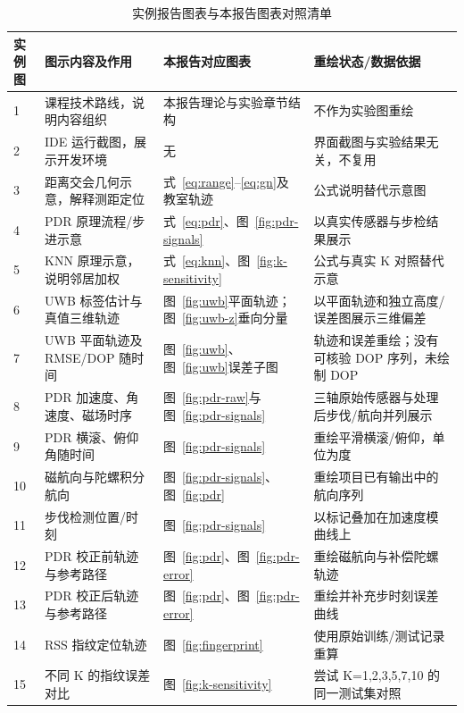 \begin{table}[htbp]
\centering\small
\caption{实例报告图表与本报告图表对照清单}\label{tab:figure-map}
\begin{tabular}{p{1.0cm}p{4.2cm}p{4.7cm}p{3.0cm}}
\toprule
实例图 & 图示内容及作用 & 本报告对应图表 & 重绘状态/数据依据 \\
\midrule
1 & 课程技术路线，说明内容组织 & 本报告理论与实验章节结构 & 不作为实验图重绘 \\
2 & IDE 运行截图，展示开发环境 & 无 & 界面截图与实验结果无关，不复用 \\
3 & 距离交会几何示意，解释测距定位 & 式~\ref{eq:range}--\ref{eq:gn}及教室轨迹 & 公式说明替代示意图 \\
4 & PDR 原理流程/步进示意 & 式~\ref{eq:pdr}、图~\ref{fig:pdr-signals} & 以真实传感器与步检结果展示 \\
5 & KNN 原理示意，说明邻居加权 & 式~\ref{eq:knn}、图~\ref{fig:k-sensitivity} & 公式与真实 K 对照替代示意 \\
6 & UWB 标签估计与真值三维轨迹 & 图~\ref{fig:uwb}平面轨迹；图~\ref{fig:uwb-z}垂向分量 & 以平面轨迹和独立高度/误差图展示三维偏差 \\
7 & UWB 平面轨迹及 RMSE/DOP 随时间 & 图~\ref{fig:uwb}、图~\ref{fig:uwb}误差子图 & 轨迹和误差重绘；没有可核验 DOP 序列，未绘制 DOP \\
8 & PDR 加速度、角速度、磁场时序 & 图~\ref{fig:pdr-raw}与图~\ref{fig:pdr-signals} & 三轴原始传感器与处理后步伐/航向并列展示 \\
9 & PDR 横滚、俯仰角随时间 & 图~\ref{fig:pdr-signals} & 重绘平滑横滚/俯仰，单位为度 \\
10 & 磁航向与陀螺积分航向 & 图~\ref{fig:pdr-signals}、图~\ref{fig:pdr} & 重绘项目已有输出中的航向序列 \\
11 & 步伐检测位置/时刻 & 图~\ref{fig:pdr-signals} & 以标记叠加在加速度模曲线上 \\
12 & PDR 校正前轨迹与参考路径 & 图~\ref{fig:pdr}、图~\ref{fig:pdr-error} & 重绘磁航向与补偿陀螺轨迹 \\
13 & PDR 校正后轨迹与参考路径 & 图~\ref{fig:pdr}、图~\ref{fig:pdr-error} & 重绘并补充步时刻误差曲线 \\
14 & RSS 指纹定位轨迹 & 图~\ref{fig:fingerprint} & 使用原始训练/测试记录重算 \\
15 & 不同 K 的指纹误差对比 & 图~\ref{fig:k-sensitivity} & 尝试 K=1,2,3,5,7,10 的同一测试集对照 \\
\bottomrule
\end{tabular}
\end{table}
